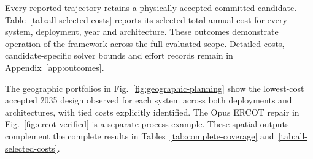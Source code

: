 \documentclass[pdflatex,sn-nature]{sn-jnl}
\begin{document}
\begin{appendices}
Every reported trajectory retains a physically accepted committed candidate. Table~\ref{tab:all-selected-costs} reports its selected total annual cost for every system, deployment, year and architecture. These outcomes demonstrate operation of the framework across the full evaluated scope. Detailed costs, candidate-specific solver bounds and effort records remain in Appendix~\ref{app:outcomes}.

The geographic portfolios in Fig.~\ref{fig:geographic-planning} show the lowest-cost accepted 2035 design observed for each system across both deployments and architectures, with tied costs explicitly identified. The Opus ERCOT repair in Fig.~\ref{fig:ercot-verified} is a separate process example. These spatial outputs complement the complete results in Tables~\ref{tab:complete-coverage} and~\ref{tab:all-selected-costs}.


\end{appendices}
\end{document}
